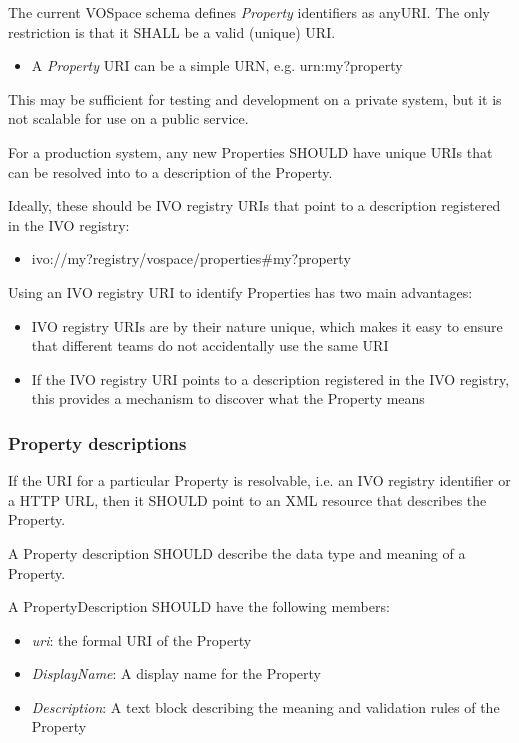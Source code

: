 \documentclass[11pt,a4paper]{ivoa}
\begin{document}
The current VOSpace schema defines \emph{Property} identifiers as anyURI. The only restriction is that it SHALL be a valid (unique) URI.

\begin{itemize}
    \item A \emph{Property} URI can be a simple URN, e.g. urn:my?property
\end{itemize}

This may be sufficient for testing and development on a private system, but it is not scalable for use on a public service.

For a production system, any new Properties SHOULD have unique URIs that can be resolved into to a description of the Property.

Ideally, these should be IVO registry URIs that point to a description registered in the IVO registry:

\begin{itemize}
    \item ivo://my?registry/vospace/properties\#my?property
\end{itemize}

Using an IVO registry URI to identify Properties has two main advantages:

\begin{itemize}
    \item IVO registry URIs are by their nature unique, which makes it easy to ensure that different teams do not accidentally use the same URI
    \item If the IVO registry URI points to a description registered in the IVO registry, this provides a mechanism to discover what the Property means
\end{itemize}

\subsubsection{Property descriptions}
\label{subsubsec:property descriptions}
If the URI for a particular Property is resolvable, i.e. an IVO registry identifier or a HTTP URL, then it SHOULD point to an XML resource that describes the Property.

A Property description SHOULD describe the data type and meaning of a Property.

A PropertyDescription SHOULD have the following members:

\begin{itemize}
    \item \emph{uri}: the formal URI of the Property
    \item \emph{DisplayName}: A display name for the Property
    \item \emph{Description}: A text block describing the meaning and validation rules of the Property
\end{itemize}
\end{document}
